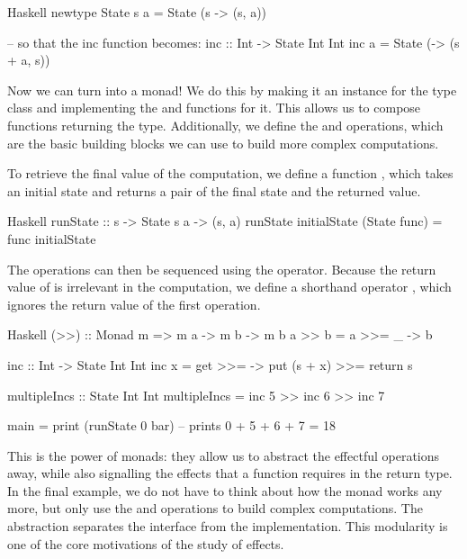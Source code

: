 \begin{lst}{Haskell}
newtype State s a = State (s -> (s, a))

-- so that the inc function becomes:
inc :: Int -> State Int Int
inc a = State (\s -> (s + a, s))
\end{lst}
%
Now we can turn  into a monad! We do this by making it an instance for the  type class and implementing the  and \hs{>>=} functions for it. This allows us to compose functions returning the  type. Additionally, we define the  and  operations, which are the basic building blocks we can use to build more complex computations.

%
To retrieve the final value of the computation, we define a function , which takes an initial state and returns a pair of the final state and the returned value.

\begin{lst}{Haskell}
runState :: s -> State s a -> (s, a)
runState initialState (State func) = func initialState
\end{lst}
%
The  operations can then be sequenced using the \hs{>>=} operator. Because the return value of  is irrelevant in the computation, we define a shorthand operator \hs{>>}, which ignores the return value of the first operation.

\begin{lst}{Haskell}
(>>) :: Monad m => m a -> m b -> m b
a >> b = a >>= \_ -> b

inc :: Int -> State Int Int
inc x = get >>= \s -> put (s + x) >>= return s

multipleIncs :: State Int Int
multipleIncs = inc 5 >> inc 6 >> inc 7

main = print (runState 0 bar) -- prints 0 + 5 + 6 + 7 = 18
\end{lst}
%
This is the power of monads: they allow us to abstract the effectful operations away, while also signalling the effects that a function requires in the return type. In the final example, we do not have to think about how the  monad works any more, but only use the  and  operations to build complex computations. The abstraction separates the interface from the implementation. This modularity is one of the core motivations of the study of effects. 

